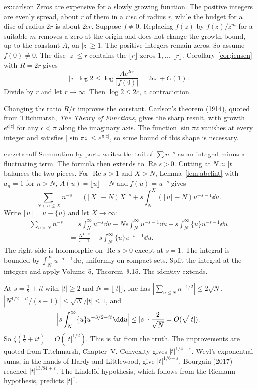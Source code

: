 \begin{solution}{ex:carlson}
\idea Zeros are expensive for a slowly growing function. The positive integers are evenly spread, about $r$ of them in a disc of radius $r$, while the budget for a disc of radius $2r$ is about $2cr$.
\writeup Suppose $f\ne0$. Replacing $f(z)$ by $f(z)/z^m$ for a suitable $m$ removes a zero at the origin and does not change the growth bound, up to the constant $A$, on $|z|\ge1$. The positive integers remain zeros. So assume $f(0)\ne0$. The disc $|z|\le r$ contains the $\lfloor r\rfloor$ zeros $1,\dots,\lfloor r\rfloor$. Corollary~\ref{cor:jensen} with $R=2r$ gives
\[
\lfloor r\rfloor\log2\le\log\frac{Ae^{2cr}}{|f(0)|}=2cr+O(1).
\]
Divide by $r$ and let $r\to\infty$. Then $\log2\le2c$, a contradiction.

Changing the ratio $R/r$ improves the constant. Carlson's theorem (1914), quoted from Titchmarsh, \emph{The Theory of Functions}, gives the sharp result, with growth $e^{c|z|}$ for any $c<\pi$ along the imaginary axis. The function $\sin\pi z$ vanishes at every integer and satisfies $|\sin\pi z|\le e^{\pi|z|}$, so some bound of this shape is necessary.
\end{solution}

\begin{solution}{ex:zetahalf}
\idea Summation by parts writes the tail of $\sum n^{-s}$ as an integral minus a fluctuating term. The formula then extends to $\operatorname{Re}s>0$. Cutting at $N\approx|t|$ balances the two pieces.
\writeup For $\operatorname{Re}s>1$ and $X>N$, Lemma~\ref{lem:abelint} with $a_n=1$ for $n>N$, $A(u)=\lfloor u\rfloor-N$ and $f(u)=u^{-s}$ gives
\[
\sum_{N<n\le X}n^{-s}=(\lfloor X\rfloor-N)X^{-s}+s\int_N^X(\lfloor u\rfloor-N)u^{-s-1}\dd u.
\]
Write $\lfloor u\rfloor=u-\{u\}$ and let $X\to\infty$:
\begin{align*}
\sum_{n>N}n^{-s}
&=s\int_N^\infty u^{-s}\dd u-Ns\int_N^\infty u^{-s-1}\dd u-s\int_N^\infty\{u\}u^{-s-1}\dd u\\
&=\frac{N^{1-s}}{s-1}-s\int_N^\infty\{u\}u^{-s-1}\dd u.
\end{align*}
The right side is holomorphic on $\operatorname{Re}s>0$ except at $s=1$. The integral is bounded by $\int_N^\infty u^{-\sigma-1}\mathrm du$, uniformly on compact sets. Split the integral at the integers and apply Volume~5, Theorem~9.15. The identity extends.

At $s=\frac12+it$ with $|t|\ge2$ and $N=\lfloor|t|\rfloor$, one has $|\sum_{n\le N}n^{-1/2}|\le2\sqrt N$, $|N^{1/2-it}/(s-1)|\le\sqrt N/|t|\le1$, and
\[
\Bigl|s\int_N^\infty\{u\}u^{-3/2-it}\dd u\Bigr|\le|s|\cdot\frac2{\sqrt N}=O(\sqrt{|t|}).
\]
So $\zeta(\frac12+it)=O(|t|^{1/2})$. This is far from the truth. The improvements are quoted from Titchmarsh, Chapter~V. Convexity gives $|t|^{1/4+\varepsilon}$. Weyl's exponential sums, in the hands of Hardy and Littlewood, give $|t|^{1/6+\varepsilon}$. Bourgain (2017) reached $|t|^{13/84+\varepsilon}$. The Lindelöf hypothesis, which follows from the Riemann hypothesis, predicts $|t|^\varepsilon$.
\end{solution}


